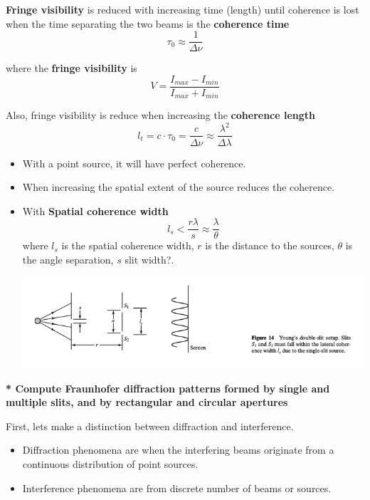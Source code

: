 \documentclass[10pt]{article}
\newcommand*{\lo}[1]{
    \textbf{* #1} \newline
}
\begin{document}
\textbf{Fringe visibility} is reduced with increasing time (length) until coherence is lost when the time separating the two beams is the \textbf{coherence time}
\[\tau_0 \approx \frac{1}{\Delta \nu}\]

where the \textbf{fringe visibility} is
\[V = \frac{I_{max} - I_{min}}{I_{max} + I_{min}}\]

Also, fringe visibility is reduce when increasing the \textbf{coherence length}
\[l_t = c \cdot \tau_0 = \frac{c}{\Delta \nu} \approx \frac{\lambda^2}{\Delta\lambda}\]

\begin{itemize}
    \item With a point source, it will have perfect coherence.
    \item When increasing the spatial extent of the source reduces the coherence.
    \item With \textbf{Spatial coherence width}
    \[l_s < \frac{r\lambda}{s} \approx \frac{\lambda}{\theta}\]
    where $l_s$ is the spatial coherence width, $r$ is the distance to the sources, $\theta$ is the angle separation, $s$ slit width?.
    \begin{center}
        \includegraphics*[scale = .5]{imgs/spatial-coherence-width-1.png}
    \end{center}
\end{itemize}

\newpage

\lo{Compute Fraunhofer diffraction patterns formed by single and multiple slits, and by rectangular and circular apertures}

\newblock

First, lets make a distinction between diffraction and interference.

\begin{itemize}
    \item Diffraction phenomena are when the interfering beams originate from a continuous distribution of point sources.
    \item Interference phenomena are from discrete number of beams or sources.
\end{itemize}
\end{document}

